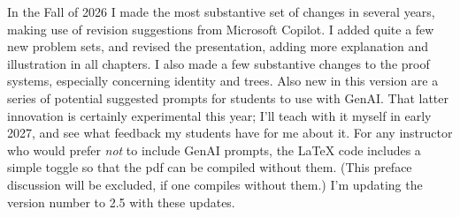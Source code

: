 
In the Fall of 2026 I made the most substantive set of changes in several years, making use of revision suggestions from Microsoft Copilot. I added quite a few new problem sets, and revised the presentation, adding more explanation and illustration in all chapters. I also made a few substantive changes to the proof systems, especially concerning identity and trees. 
\ifgenaiprompts
Also new in this version are a series of potential suggested prompts for students to use with GenAI. That latter innovation is certainly experimental this year; I'll teach with it myself in early 2027, and see what feedback my students have for me about it. For any instructor who would prefer \emph{not} to include GenAI prompts, the LaTeX code includes a simple toggle so that the pdf can be compiled without them. (This preface discussion will be excluded, if one compiles without them.)
\fi
I'm updating the version number to 2.5 with these updates.

